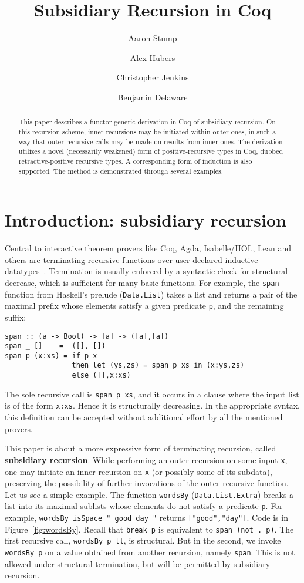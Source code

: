 \documentclass[a4paper,USenglish]{lipics-v2021}
\title{Subsidiary Recursion in Coq} %
\author{Aaron Stump}{Computer Science Dept., The University of Iowa, USA \and \url{http://www.cs.uiowa.edu/~astump/}}{aaron-stump@uiowa.edu}{http://orcid.org/0000-0002-9720-0003}{}%
\author{Alex Hubers}{Computer Science, The University of Iowa, USA}{alexander-hubers@uiowa.edu}{}{}
\author{Christopher Jenkins}{Computer Science, The University of Iowa, USA}{alexander-hubers@uiowa.edu}{http://orcid.org/
0000-0002-5434-5018}{}
\author{Benjamin Delaware}{Computer Science, Purdue University, USA \and \url{https://www.cs.purdue.edu/homes/bendy/}}{bendy@purdue.edu}{}{}
\begin{document}
\maketitle

\begin{abstract}
  This paper describes a functor-generic derivation in Coq of
  subsidiary recursion.  On this recursion scheme, inner recursions
  may be initiated within outer ones, in such a way that outer
  recursive calls may be made on results from inner ones.  The
  derivation utilizes a novel (necessarily weakened) form of
  positive-recursive types in Coq, dubbed retractive-positive
  recursive types.  A corresponding form of induction is also
  supported.  The method is demonstrated through several examples.
\end{abstract}

\section{Introduction: subsidiary recursion}
\label{sec:intro}

Central to interactive theorem provers like Coq, Agda, Isabelle/HOL,
Lean and others are terminating recursive functions over user-declared
inductive datatypes~\cite{agda,coq,isabelle-hol,lean}.  Termination is
usually enforced by a syntactic check for structural decrease, which
is sufficient for many basic functions.  For example, the
\texttt{span} function from Haskell's prelude (\verb|Data.List|) takes
a list and returns a pair of the maximal prefix whose elements satisfy
a given predicate \verb|p|, and the remaining suffix:
\begin{verbatim}
span :: (a -> Bool) -> [a] -> ([a],[a])
span _ []    =  ([], [])
span p (x:xs) = if p x
                then let (ys,zs) = span p xs in (x:ys,zs)
                else ([],x:xs)
\end{verbatim}
\noindent The sole recursive call is \verb|span p xs|, and it occurs
in a clause where the input list is of the form \verb|x:xs|.  Hence it
is structurally decreasing.  In the appropriate syntax, this
definition can be accepted without additional effort by all the
mentioned provers.

This paper is about a more expressive form of terminating recursion,
called \textbf{subsidiary recursion}.  While performing an outer
recursion on some input \verb|x|, one may initiate an inner recursion
on \verb|x| (or possibly some of its subdata), preserving the
possibility of further invocations of the outer recursive function.
Let us see a simple example.  The function \verb|wordsBy|
(\verb|Data.List.Extra|) breaks a list into its maximal sublists whose
elements do not satisfy a predicate \verb|p|.  For example,
\verb|wordsBy isSpace " good day "| returns \verb|["good","day"]|.
Code is in Figure~\ref{fig:wordsBy}.  Recall that
\verb|break p| is equivalent to \verb|span (not . p)|. The first recursive call,
\verb|wordsBy p tl|, is structural.  But in the second, we invoke
\verb|wordsBy p| on a value obtained from another recursion, namely
\verb|span|.  This is not allowed under structural termination, but
will be permitted by subsidiary recursion.
\end{document}
